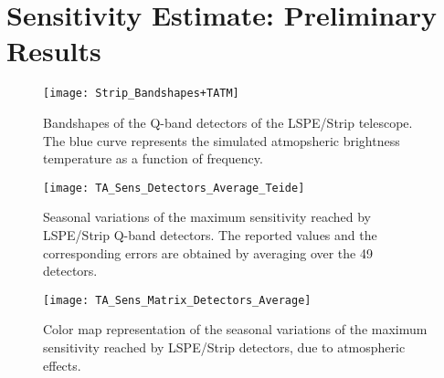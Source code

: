 \chapter{Sensitivity Estimate: Preliminary Results}\label{sensitivity}

\begin{figure}[h]
        \centering
        \texttt{[image: Strip\_Bandshapes+TATM]}
        \caption{Bandshapes of the Q-band detectors of the LSPE/Strip
        telescope. The blue curve represents the simulated atmopsheric
        brightness temperature as a function of frequency.}
        \label{fig:strip_bandshapes_tatm}
\end{figure}

\begin{figure}
        \centering
        \texttt{[image: TA\_Sens\_Detectors\_Average\_Teide]}
        \caption{Seasonal variations of the maximum sensitivity reached by
        LSPE/Strip Q-band detectors. The reported values and the
        corresponding errors are obtained by averaging over the 49
        detectors.}
        \label{fig:ta_sens_detectors_average_teide}
\end{figure}

\begin{figure}
        \centering
        \texttt{[image: TA\_Sens\_Matrix\_Detectors\_Average]}
        \caption{Color map representation of the seasonal variations of the
        maximum sensitivity reached by LSPE/Strip detectors, due to atmospheric
        effects.}
        \label{fig:ta_sens_matrix_detectors_average}
\end{figure}

